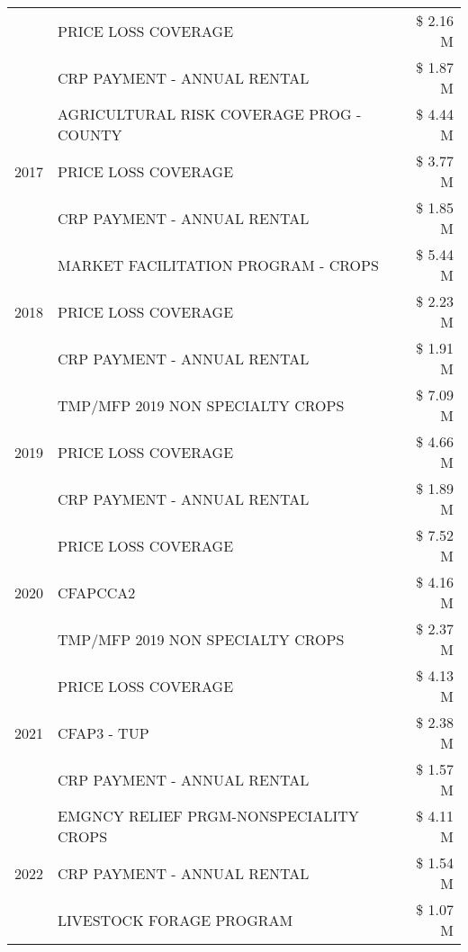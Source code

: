 \begin{tabular}{llr}
 & PRICE LOSS COVERAGE & \$ 2.16 M \\
 & CRP PAYMENT - ANNUAL RENTAL & \$ 1.87 M \\
\cline{1-3}
\multirow[t]{3}{*}{2017} & AGRICULTURAL RISK COVERAGE PROG - COUNTY & \$ 4.44 M \\
 & PRICE LOSS COVERAGE & \$ 3.77 M \\
 & CRP PAYMENT - ANNUAL RENTAL & \$ 1.85 M \\
\cline{1-3}
\multirow[t]{3}{*}{2018} & MARKET FACILITATION PROGRAM - CROPS & \$ 5.44 M \\
 & PRICE LOSS COVERAGE & \$ 2.23 M \\
 & CRP PAYMENT - ANNUAL RENTAL & \$ 1.91 M \\
\cline{1-3}
\multirow[t]{3}{*}{2019} & TMP/MFP 2019 NON SPECIALTY CROPS & \$ 7.09 M \\
 & PRICE LOSS COVERAGE & \$ 4.66 M \\
 & CRP PAYMENT - ANNUAL RENTAL & \$ 1.89 M \\
\cline{1-3}
\multirow[t]{3}{*}{2020} & PRICE LOSS COVERAGE & \$ 7.52 M \\
 & CFAPCCA2 & \$ 4.16 M \\
 & TMP/MFP 2019 NON SPECIALTY CROPS & \$ 2.37 M \\
\cline{1-3}
\multirow[t]{3}{*}{2021} & PRICE LOSS COVERAGE & \$ 4.13 M \\
 & CFAP3 - TUP & \$ 2.38 M \\
 & CRP PAYMENT - ANNUAL RENTAL & \$ 1.57 M \\
\cline{1-3}
\multirow[t]{3}{*}{2022} & EMGNCY RELIEF PRGM-NONSPECIALITY CROPS & \$ 4.11 M \\
 & CRP PAYMENT - ANNUAL RENTAL & \$ 1.54 M \\
 & LIVESTOCK FORAGE PROGRAM & \$ 1.07 M \\
\cline{1-3}
\bottomrule
\end{tabular}
